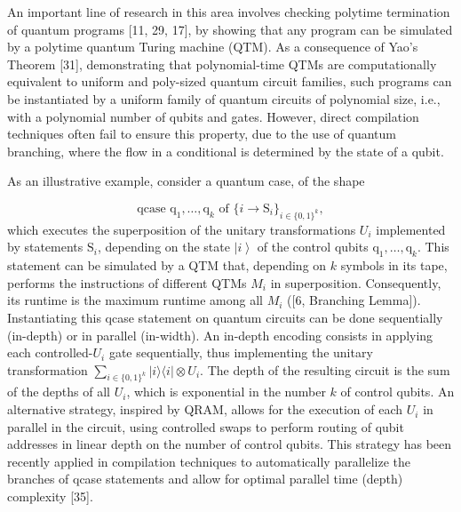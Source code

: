 \documentclass[10pt,a4paper]{amsart}
\providecommand{\outerproduct}[2]{\lvert #1\rangle\langle #2\rvert}
\begin{document}
 
 
An important line of research in this area involves checking polytime termination of quantum programs [11, 29, 17], by showing that any program can be simulated by a polytime quantum Turing machine (QTM). As a consequence of Yao’s Theorem [31], demonstrating that polynomial-time QTMs are computationally equivalent to uniform and poly-sized quantum circuit families, such programs can be instantiated by a uniform family of quantum circuits of polynomial size, i.e., with a polynomial number of qubits and gates. However, direct compilation techniques often fail to ensure this property, due to the use of quantum branching, where the flow in a conditional is determined by the state of a qubit.\par
 
 
 
As an illustrative example, consider a quantum case, of the shape\par
    \[\text{{{qcase }}}\mathrm{q}_{1},\dots,\mathrm{q}_{k}\text{{{ of }}}\{i\to%
\mathrm{S}_{i}\}_{i\in\{0,1\}^{k}},\]    
which executes the superposition of the unitary transformations $U_{i}$ implemented by statements $\mathrm{S}_{i}$, depending on the state $\left|i\right\rangle$ of the control qubits $\mathrm{q}_{1},\dots,\mathrm{q}_{k}$. This statement can be simulated by a QTM that, depending on $k$ symbols in its tape, performs the instructions of different QTMs $M_{i}$ in superposition. Consequently, its runtime is the maximum runtime among all $M_{i}$ ([6, Branching Lemma]). Instantiating this qcase statement on quantum circuits can be done sequentially (in-depth) or in parallel (in-width). An in-depth encoding consists in applying each controlled-$U_{i}$ gate sequentially, thus implementing the unitary transformation $\sum_{i\in\{0,1\}^{k}}\outerproduct{i}{i}\otimes U_{i}$. The depth of the resulting circuit is the sum of the depths of all $U_{i}$, which is exponential in the number $k$ of control qubits. An alternative strategy, inspired by QRAM, allows for the execution of each $U_{i}$ in parallel in the circuit, using controlled swaps to perform routing of qubit addresses in linear depth on the number of control qubits. This strategy has been recently applied in compilation techniques to automatically parallelize the branches of qcase statements and allow for optimal parallel time (depth) complexity [35].\par
 
\end{document}
